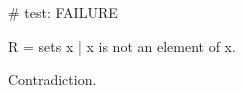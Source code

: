 # test: FAILURE

\begin{forthel}

  \begin{definition}
    R = { sets x | x is not an element of x}.
  \end{definition}

  \begin{theorem}
    Contradiction.
  \end{theorem}
\end{forthel}

